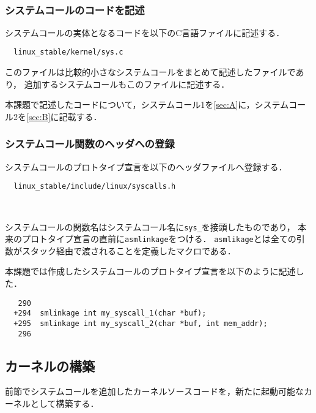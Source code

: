 \documentclass[12pt]{jsarticle}
\begin{document}
　
\subsubsection{システムコールのコードを記述}
システムコールの実体となるコードを以下のC言語ファイルに記述する．
\begin{verbatim}
  linux_stable/kernel/sys.c
\end{verbatim}
このファイルは比較的小さなシステムコールをまとめて記述したファイルであり，
追加するシステムコールもこのファイルに記述する．

本課題で記述したコードについて，システムコール1を\ref{sec:A}に，システムコール2を\ref{sec:B}に記載する．


\subsubsection{システムコール関数のヘッダへの登録}
システムコールのプロトタイプ宣言を以下のヘッダファイルへ登録する．
\begin{verbatim}
  linux_stable/include/linux/syscalls.h
\end{verbatim}　

システムコールの関数名はシステムコール名に\verb|sys_|を接頭したものであり，
本来のプロトタイプ宣言の直前に\verb|asmlinkage|をつける．
\verb|asmlikage|とは全ての引数がスタック経由で渡されることを定義したマクロである．

本課題では作成したシステムコールのプロトタイプ宣言を以下のように記述した．
\begin{verbatim}
   290	
  +294	smlinkage int my_syscall_1(char *buf);
  +295	smlinkage int my_syscall_2(char *buf, int mem_addr);
   296	
\end{verbatim}


\subsection{カーネルの構築}
前節でシステムコールを追加したカーネルソースコードを，新たに起動可能なカーネルとして構築する．　　　　
\end{document}
